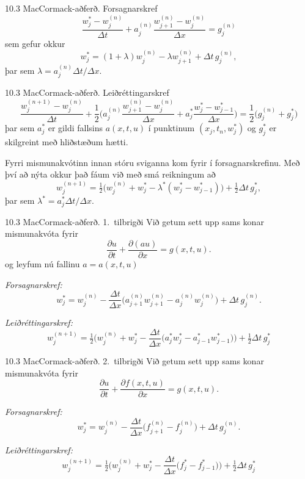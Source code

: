\begin{frame}{10.3 MacCormack-aðferð. Forsagnarskref} 
$$
\dfrac{w_j^*-w_j^{(n)}}{\Delta t} 
+a_j^{(n)}\dfrac{w_{j+1}^{(n)}-w_j^{(n)}}{\Delta x}=g_j^{(n)}
$$
sem gefur okkur
$$
w_j^*=(1+\lambda) w_j^{(n)}-\lambda w_{j+1}^{(n)}+\Delta t\, g_j^{(n)},
$$
þar sem $\lambda=a_j^{(n)}\Delta t/\Delta x$.
\end{frame}


\begin{frame}{10.3 MacCormack-aðferð.  Leiðréttingarskref} 
$$
\dfrac{w_j^{(n+1)}-w_j^{(n)}}{\Delta t}
+\dfrac 12\bigg(a_j^{(n)}\dfrac{w_{j+1}^{(n)}-w_j^{(n)}}{\Delta x}
+a_j^*\dfrac{w_j^*-w_{j-1}^*}{\Delta x}\bigg)
=\dfrac  12\big(g_j^{(n)}+g_j^*\big)
$$
þar sem  $a_j^*$ er gildi fallsins $a(x,t,u)$ í punktinum
$(x_j,t_n,w_j^*)$ og $g_j^*$ er skilgreint með hliðstæðum hætti.

\smallskip
Fyrri mismunakvótinn innan stóru sviganna kom fyrir í
forsagnarskrefinu.  Með því að nýta okkur það fáum við með smá
reikningum að 
$$
w_j^{(n+1)}=\tfrac 12
\big(w_j^{(n)}+w_j^*-\lambda^*(w_j^*-w_{j-1}^*)\big)
+\tfrac 12 \Delta t\, g_j^*,
$$
þar sem $\lambda^*=a_j^*\Delta t/\Delta x$.
\end{frame}


\begin{frame}{10.3 MacCormack-aðferð.  1.~tilbrigði} 
Við getum sett upp sams konar mismunakvóta fyrir 
$$
\dfrac{\partial u}{\partial t}
+\dfrac{\partial (au)}{\partial x}=g(x,t,u).
$$
og leyfum nú fallinu $a=a(x,t,u)$

\smallskip
{\it Forsagnarskref:} 
$$
w_j^*=w_j^{(n)}-\dfrac{\Delta t}{\Delta x}\big( 
a_{j+1}^{(n)}w_{j+1}^{(n)}-a_j^{(n)}w_j^{(n)}\big)+\Delta t\, g_j^{(n)}.
$$

\smallskip
{\it Leiðréttingarskref:}
$$
w_j^{(n+1)}=\tfrac 12\big(w_j^{(n)} +w_j^*-\dfrac{\Delta t}{\Delta x}
\big(a_j^*w_j^*-a_{j-1}^*w_{j-1}^*\big) \big)+\tfrac 12 \Delta t\, g_j^*
$$
\end{frame}


\begin{frame}{10.3 MacCormack-aðferð.  2.~tilbrigði} 
Við getum sett upp sams konar mismunakvóta fyrir 
$$
\dfrac{\partial u}{\partial t}
+\dfrac{\partial f(x,t,u)}{\partial x}=g(x,t,u).
$$

\smallskip
{\it Forsagnarskref:} 
$$
w_j^*=w_j^{(n)}-\dfrac{\Delta t}{\Delta x}\big( 
f_{j+1}^{(n)}-f_j^{(n)}\big)+\Delta t\, g_j^{(n)}.
$$

\smallskip
{\it Leiðréttingarskref:}
$$
w_j^{(n+1)}=\tfrac 12\big(w_j^{(n)} +w_j^*-\dfrac{\Delta t}{\Delta x}
\big(f_j^*-f_{j-1}^*\big) \big)+\tfrac 12 \Delta t\, g_j^*
$$
\end{frame}


